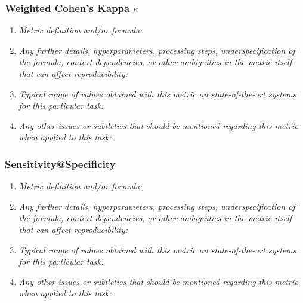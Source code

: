 \documentclass[a4paper,11pt]{article}
\begin{document}
        \subsubsection{Weighted Cohen's Kappa $\kappa$}
            \begin{enumerate}[label=\alph*.]
                \item \textit{Metric definition and/or formula:}
                \bigskip
                \item \textit{Any further details, hyperparameters, processing steps, underspecification of the formula, context dependencies, or other ambiguities in the metric itself that can affect reproducibility:}
                \bigskip
                \item \textit{Typical range of values obtained with this metric on state-of-the-art systems for this particular task:}
                \bigskip
                \item \textit{Any other issues or subtleties that should be mentioned regarding this metric when applied to this task:}
                \bigskip
            \end{enumerate}
        \subsubsection{Sensitivity@Specificity}
            \begin{enumerate}[label=\alph*.]
                \item \textit{Metric definition and/or formula:}
                \bigskip
                \item \textit{Any further details, hyperparameters, processing steps, underspecification of the formula, context dependencies, or other ambiguities in the metric itself that can affect reproducibility:}
                \bigskip
                \item \textit{Typical range of values obtained with this metric on state-of-the-art systems for this particular task:}
                \bigskip
                \item \textit{Any other issues or subtleties that should be mentioned regarding this metric when applied to this task:}
                \bigskip
            \end{enumerate}
\end{document}
